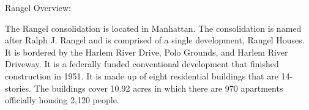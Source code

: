 Rangel Overview: 



The Rangel consolidation is located in Manhattan. The consolidation is named after Ralph J. Rangel and is comprised of a single development, Rangel Houses. It is bordered by the Harlem River Drive, Polo Grounds, and Harlem River Driveway. It is a federally funded conventional development that finished construction in 1951. It is made up of eight residential buildings that are 14-stories. The buildings cover 10.92 acres in which there are 970 apartments officially housing 2,120 people.